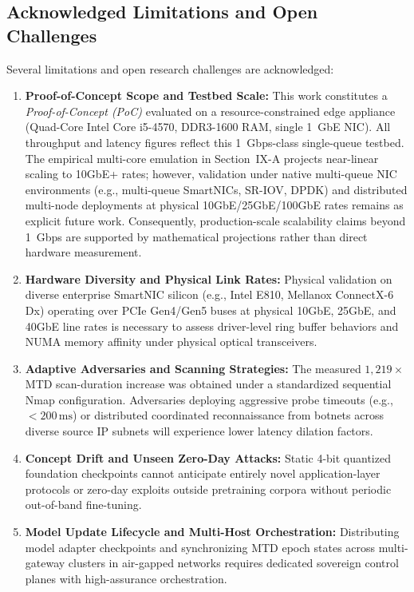 \documentclass{ieeeaccess}
\renewcommand{\_}{\textunderscore\allowbreak}
\begin{document}
\subsection{Acknowledged Limitations and Open Challenges}
Several limitations and open research challenges are acknowledged:
\begin{enumerate}
  \item \textbf{Proof-of-Concept Scope and Testbed Scale:} This work constitutes a
  \textit{Proof-of-Concept (PoC)} evaluated on a resource-constrained edge appliance
  (Quad-Core Intel Core i5-4570, DDR3-1600 RAM, single 1~GbE NIC). All throughput and
  latency figures reflect this 1~Gbps-class single-queue testbed. The empirical multi-core
  emulation in Section~IX-A projects near-linear scaling to 10GbE+ rates; however,
  validation under native multi-queue NIC environments (e.g., multi-queue SmartNICs,
  SR-IOV, DPDK) and distributed multi-node deployments at physical 10GbE/25GbE/100GbE rates
  remains as explicit future work. Consequently, production-scale scalability claims beyond
  1~Gbps are supported by mathematical projections rather than direct hardware measurement.
  \item \textbf{Hardware Diversity and Physical Link Rates:} Physical validation on diverse
  enterprise SmartNIC silicon (e.g., Intel E810, Mellanox ConnectX-6 Dx) operating over
  PCIe Gen4/Gen5 buses at physical 10GbE, 25GbE, and 40GbE line rates is necessary to assess
  driver-level ring buffer behaviors and NUMA memory affinity under physical optical transceivers.
  \item \textbf{Adaptive Adversaries and Scanning Strategies:} The measured $1{,}219\times$
  MTD scan-duration increase was obtained under a standardized sequential Nmap configuration.
  Adversaries deploying aggressive probe timeouts (e.g., $< 200\,\text{ms}$) or distributed
  coordinated reconnaissance from botnets across diverse source IP subnets will experience
  lower latency dilation factors.
  \item \textbf{Concept Drift and Unseen Zero-Day Attacks:} Static 4-bit quantized foundation
  checkpoints cannot anticipate entirely novel application-layer protocols or zero-day exploits
  outside pretraining corpora without periodic out-of-band fine-tuning.
  \item \textbf{Model Update Lifecycle and Multi-Host Orchestration:} Distributing model
  adapter checkpoints and synchronizing MTD epoch states across multi-gateway clusters in
  air-gapped networks requires dedicated sovereign control planes with high-assurance orchestration.

\end{enumerate}
\end{document}
